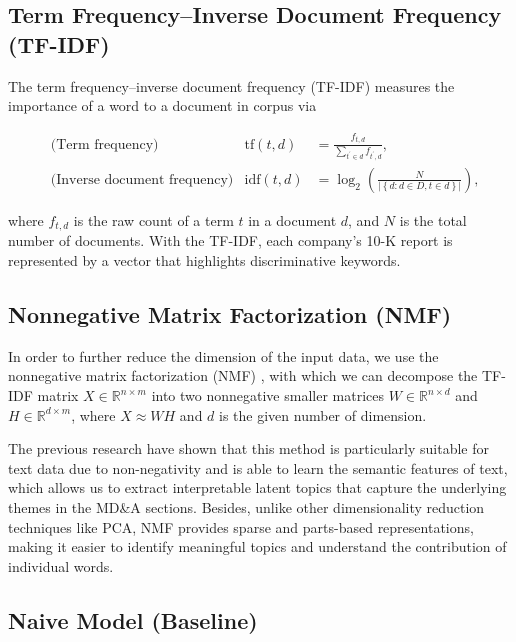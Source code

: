 \documentclass[11pt]{article}
\begin{document}
\subsection{Term Frequency–Inverse Document Frequency (TF-IDF)}

The term frequency–inverse document frequency (TF-IDF) \cite{sparck1972statistical}\cite{robertson2004understanding} measures the importance of a word to a document in corpus via

$$
  \begin{aligned}
     & \text{(Term frequency)}             & \mathrm{tf}(t, d)  & = \frac{f_{t, d}}{\sum_{t^\prime \in d} f_{t^\prime, d}},                                     \\
     & \text{(Inverse document frequency)} & \mathrm{idf}(t, d) & = \log_2\left( \frac{N}{\left\vert \left\{ d: d \in D, t \in d \right\} \right\vert} \right),
  \end{aligned}
$$

where $f_{t, d}$ is the raw count of a term $t$ in a document $d$, and $N$ is the total number of documents. With the TF-IDF, each company's 10-K report is represented by a vector that highlights discriminative keywords.

\subsection{Nonnegative Matrix Factorization (NMF)}

In order to further reduce the dimension of the input data, we use the nonnegative matrix factorization (NMF) \cite{lee2000algorithms}, with which we can decompose the TF-IDF matrix $X \in \mathbb{R}^{n \times m}$ into two nonnegative smaller matrices $W \in \mathbb{R}^{n \times d}$ and $H \in \mathbb{R}^{d \times m}$, where $X \approx W H$ and $d$ is the given number of dimension.

The previous research \cite{lee1999learning} have shown that this method is particularly suitable for text data due to non-negativity and is able to learn the semantic features of text, which allows us to extract interpretable latent topics that capture the underlying themes in the MD\&A sections. Besides, unlike other dimensionality reduction techniques like PCA, NMF provides sparse and parts-based representations, making it easier to identify meaningful topics and understand the contribution of individual words.

\subsection{Naive Model (Baseline)}
\end{document}
